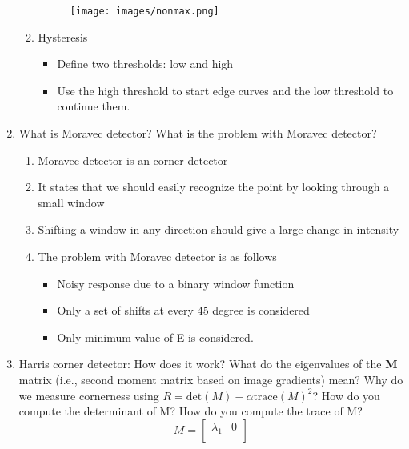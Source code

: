 \documentclass[12pt,letterpaper]{article}
\begin{document}
\begin{enumerate}
\begin{enumerate}
        \begin{center}
            \begin{figure}[h!]
                \centering
                \texttt{[image: images/nonmax.png]}
            \end{figure}
        \end{center}
        \item Hysteresis 
        \begin{itemize}
            \item Define two thresholds: low and high
            \item Use the high threshold to start edge curves and the low threshold to continue them.
        \end{itemize}
    \end{enumerate}
    \color{black}
    \item  What is Moravec detector? What is the problem with Moravec detector?\\
    \color{red}
    \begin{enumerate}
        \item Moravec detector is an corner detector
        \item It states that we should easily recognize the point by looking through a small window 
        \item Shifting a window in any direction should give a large change in intensity
        \item The problem with Moravec detector is as follows 
        \begin{itemize}
            \item Noisy response due to a binary window function
            \item Only a set of shifts at every 45 degree is considered
            \item Only minimum value of E is considered. 
        \end{itemize}
    \end{enumerate}
    \color{black}
    \item Harris corner detector: How does it work? What do the eigenvalues of the \textbf{M} matrix (i.e., second moment matrix based on image gradients) mean? Why do we measure cornerness using $R = \text{det}(M) - \alpha \text{trace}(M)^2$? How do you compute the determinant of M? How do you compute the trace of M?\\
    \color{red}
    $$M = \begin{bmatrix}
    \lambda_1 & 0 \\

\end{bmatrix}$$
\end{enumerate}
\end{document}
